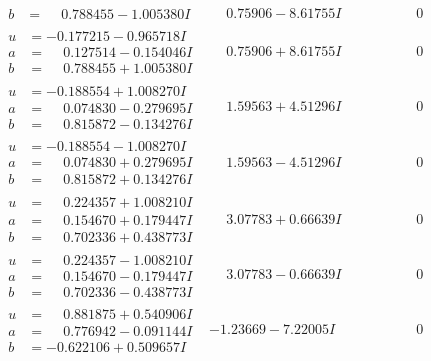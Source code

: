 \documentclass[1p]{elsarticle_modified}
\theoremstyle{definition}
\begin{document}
$$\begin{array}{c|c|c}
\begin{aligned}
b &= \phantom{-}0.788455 - 1.005380 I\end{aligned}
 & \phantom{-}0.75906 - 8.61755 I & \phantom{-0.000000 } 0 \\ \hline\begin{aligned}
u &= -0.177215 - 0.965718 I \\
a &= \phantom{-}0.127514 - 0.154046 I \\
b &= \phantom{-}0.788455 + 1.005380 I\end{aligned}
 & \phantom{-}0.75906 + 8.61755 I & \phantom{-0.000000 } 0 \\ \hline\begin{aligned}
u &= -0.188554 + 1.008270 I \\
a &= \phantom{-}0.074830 - 0.279695 I \\
b &= \phantom{-}0.815872 - 0.134276 I\end{aligned}
 & \phantom{-}1.59563 + 4.51296 I & \phantom{-0.000000 } 0 \\ \hline\begin{aligned}
u &= -0.188554 - 1.008270 I \\
a &= \phantom{-}0.074830 + 0.279695 I \\
b &= \phantom{-}0.815872 + 0.134276 I\end{aligned}
 & \phantom{-}1.59563 - 4.51296 I & \phantom{-0.000000 } 0 \\ \hline\begin{aligned}
u &= \phantom{-}0.224357 + 1.008210 I \\
a &= \phantom{-}0.154670 + 0.179447 I \\
b &= \phantom{-}0.702336 + 0.438773 I\end{aligned}
 & \phantom{-}3.07783 + 0.66639 I & \phantom{-0.000000 } 0 \\ \hline\begin{aligned}
u &= \phantom{-}0.224357 - 1.008210 I \\
a &= \phantom{-}0.154670 - 0.179447 I \\
b &= \phantom{-}0.702336 - 0.438773 I\end{aligned}
 & \phantom{-}3.07783 - 0.66639 I & \phantom{-0.000000 } 0 \\ \hline\begin{aligned}
u &= \phantom{-}0.881875 + 0.540906 I \\
a &= \phantom{-}0.776942 - 0.091144 I \\
b &= -0.622106 + 0.509657 I\end{aligned}
 & -1.23669 - 7.22005 I & \phantom{-0.000000 } 0 \\ \hline\begin{aligned}

\end{aligned}
\end{array}$$
\end{document}
